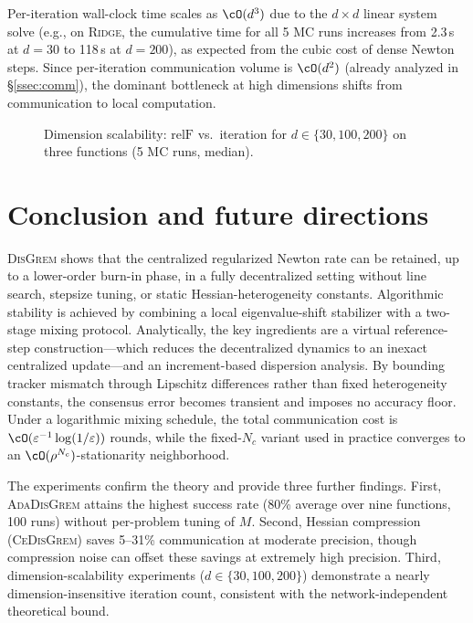 \documentclass[review,onefignum,onetabnum]{siamart171218}
\begin{document}
	Per-iteration wall-clock time scales as $\cO(d^3)$ due to the
	$d\times d$ linear system solve (e.g., on \textsc{Ridge}, the cumulative
	time for all 5 MC runs increases from 2.3\,s at $d{=}30$ to 118\,s at $d{=}200$),
	as expected from the cubic cost of dense Newton steps.
	Since per-iteration communication volume is $\cO(d^2)$
	(already analyzed in \S\ref{ssec:comm}), the dominant bottleneck
	at high dimensions shifts from communication to local computation.
	
	\begin{figure}[htbp]
		\centering
		\caption{Dimension scalability: $\mathrm{relF}$ vs.\ iteration for
			$d\in\{30,100,200\}$ on three functions (5 MC runs, median).}
		\label{fig:scalability}
	\end{figure}
	
	
	\section{Conclusion and future directions}\label{sec:conclusion}
	
	\textsc{DisGrem} shows that the centralized regularized Newton rate can
	be retained, up to a lower-order burn-in phase, in a fully decentralized
	setting without line search, stepsize tuning, or static
	Hessian-heterogeneity constants.
	Algorithmic stability is achieved by combining a local eigenvalue-shift
	stabilizer with a two-stage mixing protocol.
	Analytically, the key ingredients are a virtual reference-step
	construction---which reduces the decentralized dynamics to an inexact
	centralized update---and an increment-based dispersion analysis.
	By bounding tracker mismatch through Lipschitz differences rather than
	fixed heterogeneity constants, the consensus error becomes transient and
	imposes no accuracy floor.
	Under a logarithmic mixing schedule, the total communication cost
	is $\cO(\varepsilon^{-1}\log(1/\varepsilon))$ rounds, while the
	fixed-$N_c$ variant used in practice converges to an
	$\cO(\rho^{N_c})$-stationarity neighborhood.
	
	The experiments confirm the theory and provide three further findings. First, \textsc{AdaDisGrem} attains the highest success rate
	(80\% average over nine functions, 100 runs) without per-problem tuning
	of $M$. Second, Hessian compression (\textsc{CeDisGrem}) saves 5--31\%
	communication at moderate precision, though compression noise can offset
	these savings at extremely high precision. Third, dimension-scalability
	experiments ($d\in\{30,100,200\}$) demonstrate a nearly dimension-insensitive
	iteration count, consistent with the network-independent theoretical bound.
	
\end{document}
